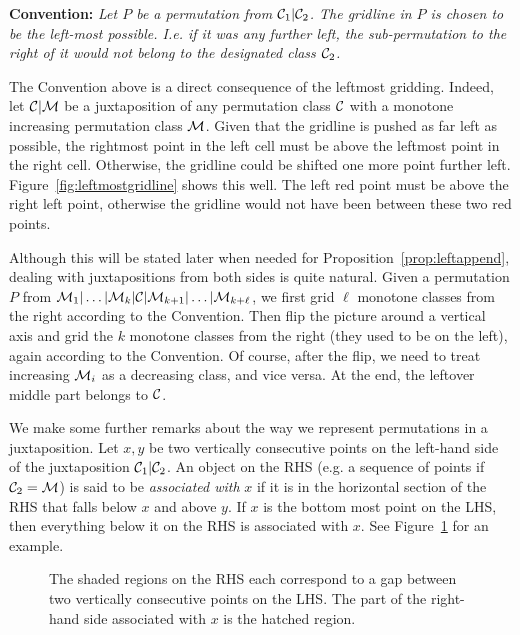 \documentclass[12pt, a4paper, twoside]{report}
\begin{document}
\noindent\textbf{Convention:} \emph{Let $P$ be a permutation from $\mathcal{C}_1|\mathcal{C}_2$. The gridline in $P$ is chosen to be the left-most possible. I.e. if it was any further left, the sub-permutation to the right of it would not belong to the designated class $\mathcal{C}_2$.}

The Convention above is a direct consequence of the leftmost gridding. Indeed, let $\mathcal{C}|\mathcal{M}$ be a juxtaposition of any permutation class $\mathcal{C}$ with a monotone increasing permutation class $\mathcal{M}$. Given that the gridline is pushed as far left as possible, the rightmost point in the left cell must be above the leftmost point in the right cell. Otherwise, the gridline could be shifted one more point further left. Figure~\ref{fig:leftmostgridline} shows this well. The left red point must be above the right left point, otherwise the gridline would not have been between these two red points.

Although this will be stated later when needed for Proposition~\ref{prop:leftappend}, dealing with juxtapositions from both sides is quite natural. Given a permutation $P$ from $\mathcal{M}_1|\ldots|\mathcal{M}_k|\mathcal{C}|\mathcal{M}_{k+1}|\ldots|\mathcal{M}_{k+\ell}$, we first grid $\ell$ monotone classes from the right according to the Convention. Then flip the picture around a vertical axis and grid the $k$ monotone classes from the right (they used to be on the left), again according to the Convention. Of course, after the flip, we need to treat increasing $\mathcal{M}_i$ as a decreasing class, and vice versa. At the end, the leftover middle part belongs to $\mathcal{C}$. 

We make some further remarks about the way we represent permutations in a juxtaposition. Let $x,y$ be two vertically consecutive points on the left-hand side of the juxtaposition $\mathcal{C}_1|\mathcal{C}_2$. An object on the RHS (e.g. a sequence of points if $\mathcal{C}_2 = \mathcal{M}$) is said to be \emph{associated with} $x$ if it is in the horizontal section of the RHS that falls below $x$ and above $y$. If $x$ is the bottom most point on the LHS, then everything below it on the RHS is associated with $x$. See Figure~\ref{fig:xregion} for an example.
\begin{figure}[ht]
  \centering
  \caption{The shaded regions on the RHS each correspond to a gap between two vertically consecutive points on the LHS. The part of the right-hand side associated with $x$ is the hatched region.}
  \label{fig:xregion}
\end{figure}
\end{document}
